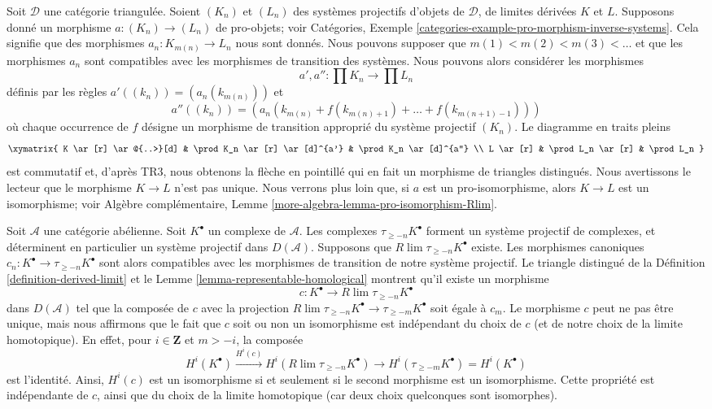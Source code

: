 \begin{remark}
\label{remark-functoriality-derived-limit}
Soit $\mathcal{D}$ une catégorie triangulée. Soient $(K_n)$ et $(L_n)$ des
systèmes projectifs d'objets de $\mathcal{D}$, de limites dérivées $K$ et $L$.
Supposons donné un morphisme $a : (K_n) \to (L_n)$ de pro-objets; voir
Catégories, Exemple
\ref{categories-example-pro-morphism-inverse-systems}.
Cela signifie que des morphismes $a_n : K_{m(n)} \to L_n$ nous sont donnés.
Nous pouvons supposer que $m(1) < m(2) < m(3) < \ldots$ et que les morphismes
$a_n$ sont compatibles avec les morphismes de transition des systèmes.
Nous pouvons alors considérer les morphismes
$$
a', a'' : \prod K_n \longrightarrow \prod L_n
$$
définis par les règles $a'((k_n)) = (a_n(k_{m(n)}))$ et
$$
a''((k_n)) =
(a_n(k_{m(n)} + f(k_{m(n) + 1}) + \ldots + f(k_{m(n + 1) - 1})))
$$
où chaque occurrence de $f$ désigne un morphisme de transition approprié du
système projectif $(K_n)$. Le diagramme en traits pleins
$$
\xymatrix{
K \ar[r] \ar@{..>}[d] & \prod K_n \ar[r] \ar[d]^{a'} &
\prod K_n \ar[d]^{a''} \\
L \ar[r] & \prod L_n \ar[r] & \prod L_n
}
$$
est commutatif et, d'après TR3, nous obtenons la flèche en pointillé qui en
fait un morphisme de triangles distingués. Nous avertissons le lecteur que le
morphisme $K \to L$ n'est pas unique. Nous verrons plus loin que, si $a$ est
un pro-isomorphisme, alors $K \to L$ est un isomorphisme; voir
Algèbre complémentaire, Lemme
\ref{more-algebra-lemma-pro-isomorphism-Rlim}.
\end{remark}

\begin{remark}
\label{remark-map-into-derived-limit-truncations}
Soit $\mathcal{A}$ une catégorie abélienne. Soit $K^\bullet$ un complexe de
$\mathcal{A}$. Les complexes $\tau_{\geq -n}K^\bullet$ forment un système
projectif de complexes, et déterminent en particulier un système projectif
dans $D(\mathcal{A})$. Supposons que
$R\lim \tau_{\geq -n}K^\bullet$ existe. Les morphismes canoniques
$c_n : K^\bullet \to \tau_{\geq -n}K^\bullet$ sont alors compatibles avec les
morphismes de transition de notre système projectif. Le triangle distingué de
la Définition \ref{definition-derived-limit} et le
Lemme \ref{lemma-representable-homological} montrent qu'il existe un morphisme
$$
c : K^\bullet \longrightarrow R\lim \tau_{\geq -n}K^\bullet
$$
dans $D(\mathcal{A})$ tel que la composée de $c$ avec la projection
$R\lim \tau_{\geq -n}K^\bullet \to \tau_{\geq -m}K^\bullet$ soit égale à
$c_m$. Le morphisme $c$ peut ne pas être unique, mais nous affirmons que le
fait que $c$ soit ou non un isomorphisme est indépendant du choix de $c$ (et
de notre choix de la limite homotopique). En effet, pour
$i \in \mathbf{Z}$ et $m > -i$, la composée
$$
H^i(K^\bullet) \xrightarrow{H^i(c)} H^i(R\lim \tau_{\geq -n}K^\bullet)
\to H^i(\tau_{\geq -m}K^\bullet) = H^i(K^\bullet)
$$
est l'identité. Ainsi, $H^i(c)$ est un isomorphisme si et seulement si le
second morphisme est un isomorphisme. Cette propriété est indépendante de
$c$, ainsi que du choix de la limite homotopique (car deux choix quelconques
sont isomorphes).
\end{remark}

